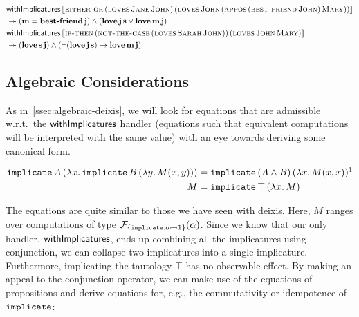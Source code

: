 \begin{align*}
  & \textsf{withImplicatures}\,\llbracket \textsc{either-or}\,(\textsc{loves}\,\textsc{Jane}\,\textsc{John})\,(\textsc{loves}\,\textsc{John}\,(\textsc{appos}\,(\textsc{best-friend}\,\textsc{John})\,\textsc{Mary})) \rrbracket \nonumber \\
  & \twoheadrightarrow (\textbf{m} = \textbf{best-friend}\,\textbf{j}) \land (\textbf{love}\,\textbf{j}\,\textbf{s} \lor \textbf{love}\,\textbf{m}\,\textbf{j}) \\
  & \textsf{withImplicatures}\,\llbracket \textsc{if-then}\,(\textsc{not-the-case}\,(\textsc{loves}\,\textsc{Sarah}\,\textsc{John}))\,(\textsc{loves}\,\textsc{John}\,\textsc{Mary}) \rrbracket \nonumber \\
  & \twoheadrightarrow (\textbf{love}\,\textbf{s}\,\textbf{j}) \land (\lnot(\textbf{love}\,\textbf{j}\,\textbf{s}) \to \textbf{love}\,\textbf{m}\,\textbf{j})
\end{align*}


\subsection{Algebraic Considerations}
\label{ssec:algebraic-ci}

As in~\ref{ssec:algebraic-deixis}, we will look for equations that are
admissible w.r.t.\ the $\textsf{withImplicatures}$ handler (equations such that
equivalent computations will be interpreted with the same value) with an
eye towards deriving some canonical form.

\begin{align*}
  \app{\op{implicate}}{A}{(\lam{x}{\app{\op{implicate}}{B}{(\lam{y}{M(x,y)})}})}
  &= \app{\op{implicate}}{(A \land B)}{(\lam{x}{M(x,x)})}\footnotemark \\
  M &= \app{\op{implicate}}{\top}{(\lam{x}{M})}
\end{align*}


The equations are quite similar to those we have seen with deixis. Here,
$M$ ranges over computations of type
$\mathcal{F}_{\{ \mathtt{implicate} : o \rightarrowtail 1 \}}(\alpha)$. Since we know that our
only handler, $\textsf{withImplicatures}$, ends up combining all the implicatures
using conjunction, we can collapse two implicatures into a single
implicature. Furthermore, implicating the tautology $\top$ has no
observable effect. By making an appeal to the conjunction operator, we can
make use of the equations of propositions and derive equations for, e.g.,
the commutativity or idempotence of $\mathtt{implicate}$:

